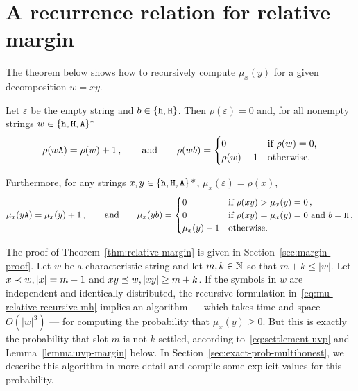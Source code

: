 

\section{A recurrence relation for relative margin}\label{sec:margin-recurrence}
The theorem below shows how to recursively compute $\mu_x(y)$ 
for a given decomposition $w = xy$.


\begin{theorem}\label{thm:relative-margin}
  Let $\varepsilon$ be the empty string 
  and $b \in \{\mathtt{h}, \mathtt{H}\}$. 
  Then $\rho(\varepsilon) = 0$ 
  and, for all nonempty strings $w \in \{\mathtt{h}, \mathtt{H}, \mathtt{A}\}^*$ 
  \begin{equation}
    \rho(w\mathtt{A}) = \rho(w) + 1\,, \qquad\text{and}\qquad
    \rho(wb) = \begin{cases} 0 & \text{if $\rho(w) = 0$,}\\
      \rho(w)-1 & \text{otherwise.}
    \end{cases}
    \label{eq:rho-recursive-mh}
  \end{equation}


  Furthermore, for any strings $x, y \in\{\mathtt{h}, \mathtt{H}, \mathtt{A}\}\text{\emph{*}}$,
  $\mu_x(\varepsilon) =\rho(x)$, 
  \begin{equation}
    \mu_x(y\mathtt{A})= \mu_x(y)+1\,,\qquad\text{and}\qquad
    \mu_x(yb)= \begin{cases}
      0 & \text{if $\rho(xy) > \mu_x(y)=0$}\,, \\
      0 & \text{if $\rho(xy) = \mu_x(y) = 0$ and $b = \mathtt{H}$}\,, \\
      \mu_x(y)-1 & \text{otherwise.}
    \end{cases}
    \label{eq:mu-relative-recursive-mh}
  \end{equation}

\end{theorem}
The proof of Theorem~\ref{thm:relative-margin} is given in Section~\ref{sec:margin-proof}. 
Let $w$ be a characteristic string and 
let $m, k \in \mathbb{N}$ so that $m + k \leq |w|$. 
Let $x \prec w, |x| = m-1$ and $xy \preceq w, |xy| \geq m + k$.
If the symbols in $w$ are independent and identically distributed, 
the recursive formulation in~\eqref{eq:mu-relative-recursive-mh} implies an algorithm --- which takes time and space $O(|w|^3)$ --- 
for computing the probability that $\mu_x(y) \geq 0$. 
But this is exactly the probability that slot $m$ is not $k$-settled, 
according to~\eqref{eq:settlement-uvp} 
and Lemma~\ref{lemma:uvp-margin} below. 
In Section~\ref{sec:exact-prob-multihonest}, 
we describe this algorithm in more detail and 
compile some explicit values for this probability.


